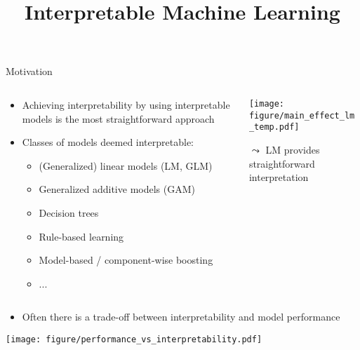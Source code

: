 \documentclass[11pt,compress,t,notes=noshow, aspectratio=169, xcolor=table]{beamer}
\title{Interpretable Machine Learning}
\date{}
\begin{document}
 

\newcommand{\titlefigure}{figure/whitebox}
\newcommand{\learninggoals}{
\item Why should we use interpretable models?
\item Advantages and disadvantages of interpretable models
}


\begin{frame}{Motivation}
\begin{columns}[T, totalwidth = \textwidth]
    \begin{column}{0.58\textwidth}
    \begin{itemize}
       \item Achieving interpretability by using interpretable models is the most straightforward approach
         \item Classes of models deemed interpretable:
   \begin{itemize}
  \footnotesize
  \item (Generalized) linear models (LM, GLM)
  \item Generalized additive models (GAM)
  \item Decision trees
  \item Rule-based learning
  \item Model-based / component-wise boosting
  \item ...
\end{itemize}
    \end{itemize}
    

    \end{column}
    \begin{column}{0.42\textwidth}  %
    \centering
  \texttt{[image: figure/main\_effect\_lm\_temp.pdf]}
  \begin{center}
    $\leadsto$ LM provides straightforward interpretation
  \end{center}

    \end{column}
\end{columns}

\begin{itemize}
 \item Often there is a trade-off between interpretability and model performance 
\end{itemize}
\centering
\texttt{[image: figure/performance\_vs\_interpretability.pdf]}
\end{frame}
\end{document}
